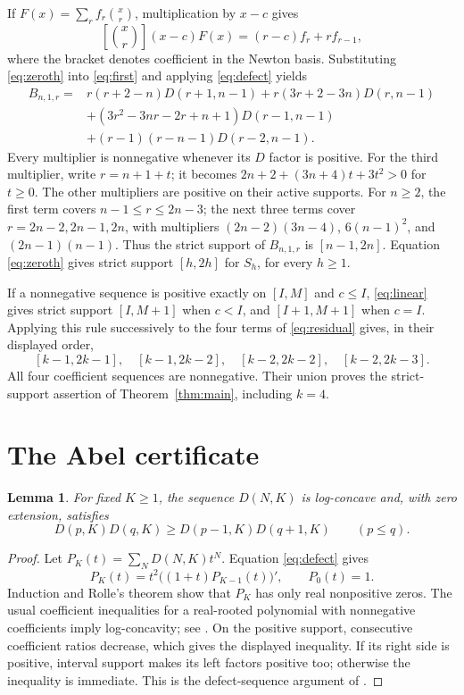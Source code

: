 \documentclass[11pt]{article}
\newtheorem{lemma}[theorem]{Lemma}
\begin{document}
If $F(x)=\sum_r f_r\binom{x}{r}$, multiplication by $x-c$ gives
\begin{equation}\label{eq:linear}
\left[\binom{x}{r}\right](x-c)F(x)=(r-c)f_r+r f_{r-1},
\end{equation}
where the bracket denotes coefficient in the Newton basis. Substituting
\eqref{eq:zeroth} into \eqref{eq:first} and applying
\eqref{eq:defect} yields
\begin{equation}\label{eq:firstcoeff}
\begin{aligned}
B_{n,1,r}={}&r(r+2-n)D(r+1,n-1)
 +r(3r+2-3n)D(r,n-1)\\
&+(3r^2-3nr-2r+n+1)D(r-1,n-1)\\
&+(r-1)(r-n-1)D(r-2,n-1).
\end{aligned}
\end{equation}
Every multiplier is nonnegative whenever its $D$ factor is positive.
For the third multiplier, write $r=n+1+t$; it becomes
$2n+2+(3n+4)t+3t^2>0$ for $t\geq0$. The other multipliers are positive
on their active supports. For $n\geq2$, the first term covers
$n-1\leq r\leq2n-3$; the next three terms cover $r=2n-2,2n-1,2n$,
with multipliers $(2n-2)(3n-4)$, $6(n-1)^2$, and $(2n-1)(n-1)$.
Thus the strict support of $B_{n,1,r}$ is $[n-1,2n]$.
Equation \eqref{eq:zeroth} gives strict support $[h,2h]$ for $S_h$,
for every $h\geq1$.

If a nonnegative sequence is positive exactly on $[I,M]$ and $c\leq I$,
\eqref{eq:linear} gives strict support $[I,M+1]$ when $c<I$, and
$[I+1,M+1]$ when $c=I$. Applying this rule successively to the four
terms of \eqref{eq:residual} gives, in their displayed order,
\[
[k-1,2k-1],\quad [k-1,2k-2],\quad
[k-2,2k-2],\quad [k-2,2k-3].
\]
All four coefficient sequences are nonnegative. Their union proves the
strict-support assertion of Theorem~\ref{thm:main}, including $k=4$.

\section{The Abel certificate}

\begin{lemma}\label{lem:defectLC}
For fixed $K\geq1$, the sequence $D(N,K)$ is log-concave and, with zero
extension, satisfies
\[
D(p,K)D(q,K)\geq D(p-1,K)D(q+1,K)\qquad(p\leq q).
\]
\end{lemma}
\begin{proof}
Let $P_K(t)=\sum_N D(N,K)t^N$. Equation \eqref{eq:defect} gives
\[
P_K(t)=t^2\bigl((1+t)P_{K-1}(t)\bigr)',\qquad P_0(t)=1.
\]
Induction and Rolle's theorem show that $P_K$ has only real nonpositive
zeros. The usual coefficient inequalities for a real-rooted polynomial
with nonnegative coefficients imply log-concavity; see
\cite[Lemma 1.1]{Branden2014}. On the positive support, consecutive
coefficient ratios decrease, which gives the displayed inequality.
If its right side is positive, interval support makes its left factors
positive too; otherwise the inequality is immediate. This is the
defect-sequence argument of \cite[Lemma 5.3]{BercziFeher2026}.
\end{proof}
\end{document}
